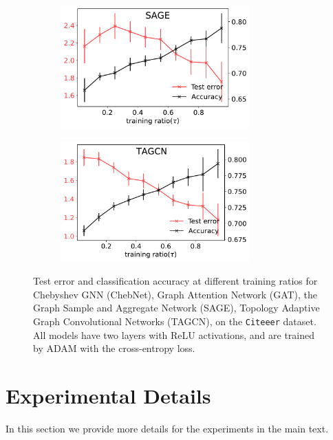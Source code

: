 \documentclass[9pt,twocolumn]{pnas-new}
\begin{document}
\begin{figure}[ht]
        \begin{subfigure}[b]{0.475\textwidth}  
            \centering 
            \includegraphics[width=0.8\textwidth]{fig/G_SAGEConv_ci.pdf}
            \caption{}\label{fig_moreGNN:c}
        \end{subfigure}
        \hfill
        \begin{subfigure}[b]{0.475\textwidth}  
            \centering 
            \includegraphics[width=0.8\textwidth]{fig/G_TAGCN_ci.pdf}
            \caption{}\label{fig_moreGNN:d}
        \end{subfigure}
        \caption{Test error and classification accuracy at different training ratios for Chebyshev GNN (ChebNet), Graph Attention Network (GAT), the Graph Sample and Aggregate Network (SAGE), Topology Adaptive Graph Convolutional Networks (TAGCN), on the \texttt{Citeeer} dataset. All models have two layers with ReLU activations, and are trained by ADAM with the cross-entropy loss.} 
        \label{fig_moreGNN}
    \end{figure}


\section{Experimental Details}\label{APP: experiment details}
In this section we provide more details for the experiments in the main text.  
\end{document}
